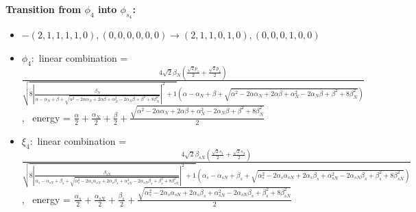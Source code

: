 \documentclass[12pt,a4paper]{article}
\begin{document}
        \noindent\textbf{Transition from $\phi_{4}$ into $\phi_{s_{4}}$:}
        \begin{itemize}
            \item $- (2, 1, 1, 1, 1, 0), (0, 0, 0, 0, 0, 0) \rightarrow (2, 1, 1, 0, 1, 0), (0, 0, 0, 1, 0, 0)$
        
            \item $\phi_{4}:$ linear combination = $\frac{4 \sqrt{2} \beta_{N} \left(\frac{\sqrt{2} p_{1}}{2} + \frac{\sqrt{2} p_{4}}{2}\right)}{\sqrt{8 \left|{\frac{\beta_{N}}{\alpha - \alpha_{N} + \beta + \sqrt{\alpha^{2} - 2 \alpha \alpha_{N} + 2 \alpha \beta + \alpha_{N}^{2} - 2 \alpha_{N} \beta + \beta^{2} + 8 \beta_{N}^{2}}}}\right|^{2} + 1} \left(\alpha - \alpha_{N} + \beta + \sqrt{\alpha^{2} - 2 \alpha \alpha_{N} + 2 \alpha \beta + \alpha_{N}^{2} - 2 \alpha_{N} \beta + \beta^{2} + 8 \beta_{N}^{2}}\right)}$, \
            energy = $\frac{\alpha}{2} + \frac{\alpha_{N}}{2} + \frac{\beta}{2} + \frac{\sqrt{\alpha^{2} - 2 \alpha \alpha_{N} + 2 \alpha \beta + \alpha_{N}^{2} - 2 \alpha_{N} \beta + \beta^{2} + 8 \beta_{N}^{2}}}{2}$
            
            \item $\xi_{4}:$ linear combination = $\frac{4 \sqrt{2} \beta_{s N} \left(\frac{\sqrt{2} s_{1}}{2} + \frac{\sqrt{2} s_{4}}{2}\right)}{\sqrt{8 \left|{\frac{\beta_{s N}}{\alpha_{s} - \alpha_{s N} + \beta_{s} + \sqrt{\alpha_{s}^{2} - 2 \alpha_{s} \alpha_{s N} + 2 \alpha_{s} \beta_{s} + \alpha_{s N}^{2} - 2 \alpha_{s N} \beta_{s} + \beta_{s}^{2} + 8 \beta_{s N}^{2}}}}\right|^{2} + 1} \left(\alpha_{s} - \alpha_{s N} + \beta_{s} + \sqrt{\alpha_{s}^{2} - 2 \alpha_{s} \alpha_{s N} + 2 \alpha_{s} \beta_{s} + \alpha_{s N}^{2} - 2 \alpha_{s N} \beta_{s} + \beta_{s}^{2} + 8 \beta_{s N}^{2}}\right)}$, \
            energy = $\frac{\alpha_{s}}{2} + \frac{\alpha_{s N}}{2} + \frac{\beta_{s}}{2} + \frac{\sqrt{\alpha_{s}^{2} - 2 \alpha_{s} \alpha_{s N} + 2 \alpha_{s} \beta_{s} + \alpha_{s N}^{2} - 2 \alpha_{s N} \beta_{s} + \beta_{s}^{2} + 8 \beta_{s N}^{2}}}{2}$
            

\end{itemize}
\end{document}
